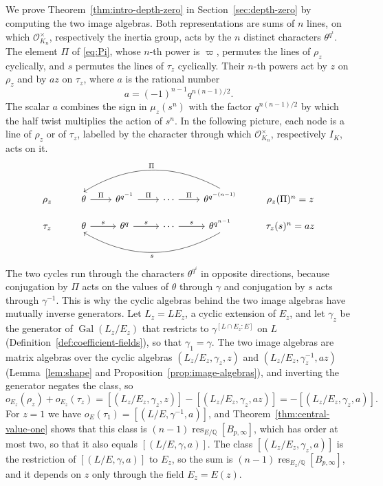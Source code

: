 \documentclass[a4paper,11pt]{amsart}
\theoremstyle{definition}
\theoremstyle{remark}
\numberwithin{equation}{section}
\newcommand{\Q}{\mathbb{Q}}
\DeclareMathOperator{\res}{res}
\DeclareMathOperator{\Gal}{Gal}
\newcommand{\OO}{\mathcal{O}}
\newcommand{\Bpinf}{B_{p,\infty}}
\begin{document}
We prove Theorem~\ref{thm:intro-depth-zero} in Section~\ref{sec:depth-zero} by computing the two image algebras. Both representations are sums of $n$ lines, on which $\OO_{K_n}^\times$, respectively the inertia group, acts by the $n$ distinct characters $\theta^{q^i}$. The element $\Pi$ of \eqref{eq:Pi}, whose $n$-th power is $\varpi$, permutes the lines of $\rho_z$ cyclically, and $s$ permutes the lines of $\tau_z$ cyclically. Their $n$-th powers act by $z$ on $\rho_z$ and by $az$ on $\tau_z$, where $a$ is the rational number
\[
 a=(-1)^{n-1}q^{n(n-1)/2}.
\]
The scalar $a$ combines the sign in $\mu_z(s^n)$ with the factor $q^{n(n-1)/2}$ by which the half twist multiplies the action of $s^n$. In the following picture, each node is a line of $\rho_z$ or of $\tau_z$, labelled by the character through which $\OO_{K_n}^\times$, respectively $I_K$, acts on it.
\[
\begin{tikzcd}[column sep=2.2em, row sep=0.8em]
 \rho_z & \theta \arrow[r, "\Pi"] & \theta^{q^{-1}} \arrow[r, "\Pi"]
 & \cdots \arrow[r, "\Pi"]
 & \theta^{q^{-(n-1)}} \arrow[lll, start anchor=north, end anchor=north,
 bend right=30, "\Pi"']
 & \rho_z(\Pi)^n=z\\
 \tau_z & \theta \arrow[r, "s"] & \theta^{q} \arrow[r, "s"]
 & \cdots \arrow[r, "s"]
 & \theta^{q^{n-1}} \arrow[lll, start anchor=south, end anchor=south,
 bend left=30, "s"]
 & \tau_z(s)^n=az
\end{tikzcd}
\]
The two cycles run through the characters $\theta^{q^i}$ in opposite directions, because conjugation by $\Pi$ acts on the values of $\theta$ through $\gamma$ and conjugation by $s$ acts through $\gamma^{-1}$. This is why the cyclic algebras behind the two image algebras have mutually inverse generators. Let $L_z=LE_z$, a cyclic extension of $E_z$, and let $\gamma_z$ be the generator of $\Gal(L_z/E_z)$ that restricts to $\gamma^{[L\cap E_z:E]}$ on $L$ (Definition~\ref{def:coefficient-fields}), so that $\gamma_1=\gamma$. The two image algebras are matrix algebras over the cyclic algebras $(L_z/E_z,\gamma_z,z)$ and $(L_z/E_z,\gamma_z^{-1},az)$ (Lemma~\ref{lem:shape} and Proposition~\ref{prop:image-algebras}), and inverting the generator negates the class, so
\[
 o_{E_z}(\rho_z)+o_{E_z}(\tau_z) = [(L_z/E_z,\gamma_z,z)]-[(L_z/E_z,\gamma_z,az)] = -[(L_z/E_z,\gamma_z,a)].
\]
For $z=1$ we have $o_E(\tau_1)=[(L/E,\gamma^{-1},a)]$, and Theorem~\ref{thm:central-value-one} shows that this class is $(n-1)\res_{E/\Q}[\Bpinf]$, which has order at most two, so that it also equals $[(L/E,\gamma,a)]$. The class $[(L_z/E_z,\gamma_z,a)]$ is the restriction of $[(L/E,\gamma,a)]$ to $E_z$, so the sum is $(n-1)\res_{E_z/\Q}[\Bpinf]$, and it depends on $z$ only through the field $E_z=E(z)$.
\end{document}
